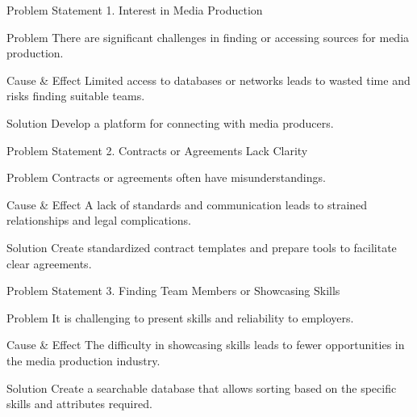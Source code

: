 \documentclass[aspectratio=169]{beamer}
\begin{document}
\begin{frame}{Problem Statement}
    1. Interest in Media Production
    \begin{alertblock}{Problem}
        There are significant challenges in finding or accessing sources for media production.
    \end{alertblock}

    \begin{block}{Cause \& Effect}
        Limited access to databases or networks leads to wasted time and risks finding suitable teams.
    \end{block}

    \begin{exampleblock}{Solution}
        Develop a platform for connecting with media producers.
    \end{exampleblock}
\end{frame}

\begin{frame}{Problem Statement}
    2. Contracts or Agreements Lack Clarity
    \begin{alertblock}{Problem}
        Contracts or agreements often have misunderstandings.
    \end{alertblock}

    \begin{block}{Cause \& Effect}
        A lack of standards and communication leads to strained relationships and legal complications.
    \end{block}

    \begin{exampleblock}{Solution}
        Create standardized contract templates and prepare tools to facilitate clear agreements.
    \end{exampleblock}

\end{frame}

\begin{frame}{Problem Statement}
    3. Finding Team Members or Showcasing Skills
    \begin{alertblock}{Problem}
        It is challenging to present skills and reliability to employers.
    \end{alertblock}

    \begin{block}{Cause \& Effect}
        The difficulty in showcasing skills leads to fewer opportunities in the media production industry.
    \end{block}

    \begin{exampleblock}{Solution}
        Create a searchable database that allows sorting based on the specific skills and attributes required.
    \end{exampleblock}

\end{frame}
\end{document}
